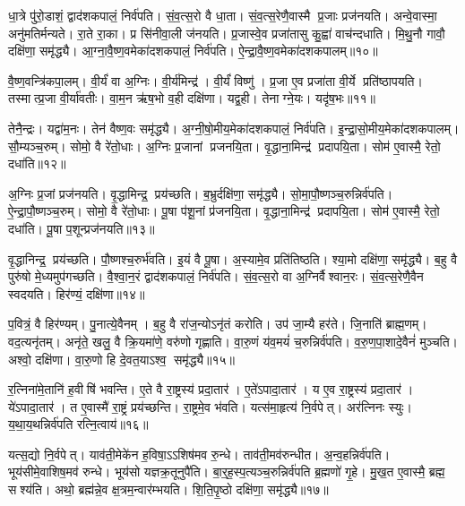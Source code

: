 धा॒त्रे पु॑रो॒डाशं॒ द्वाद॑शकपालं॒ निर्व॑पति।
सं॒व॒त्स॒रो वै धा॒ता।
सं॒व॒त्स॒रेणै॒वास्मै प्र॒जाः प्रज॑नयति।
अन्वे॒वास्मा॒ अनु॑मतिर्मन्यते।
रा॒ते रा॒का।
प्र सि॑नीवा॒ली ज॑नयति।
प्र॒जास्वे॒व प्रजा॑तासु कु॒ह्वा॑ वाच॑न्दधाति।
मि॒थु॒नौ गावौ॒ दक्षि॑णा॒ समृ॑द्ध्यै।
आ॒ग्ना॒वै॒ष्ण॒वमेका॑दशकपालं॒ निर्व॑पति।
ऐ॒न्द्रा॒वै॒ष्ण॒वमेका॑दशकपालम्॥१०॥

वै॒ष्ण॒वन्त्रि॑कपा॒लम्।
वी॒र्यं॑ वा अ॒ग्निः।
वी॒र्य॑मिन्द्र॑।
वी॒र्यं॑ विष्णु॑।
प्र॒जा ए॒व प्रजा॑ता वी॒र्ये प्रति॑ष्ठापयति।
तस्मात्प्र॒जा वी॒र्या॑वतीः।
वा॒म॒न ऋ॑ष॒भो व॒ही दक्षि॑णा।
यद्व॒ही।
तेनाग्ने॒यः।
यदृ॑ष॒भः॥११॥

तेनै॒न्द्रः।
यद्वा॑म॒नः।
तेन॑ वैष्ण॒वः समृ॑द्ध्यै।
अ॒ग्नी॒षो॒मीय॒मेका॑दशकपालं॒ निर्व॑पति।
इ॒न्द्रा॒सो॒मीय॒मेका॑दशकपालम्।
सौ॒म्यञ्च॒रुम्।
सोमो॒ वै रे॑तो॒धाः।
अ॒ग्निः प्र॒जानां प्रजनयि॒ता।
वृ॒द्धाना॒मिन्द्र॑ प्रदापयि॒ता।
सोम॑ ए॒वास्मै॒ रेतो॒ दधा॑ति॥१२॥

अ॒ग्निः प्र॒जां प्रज॑नयति।
वृ॒द्धामिन्द्र॒ प्रय॑च्छति।
ब॒भ्रुर्दक्षि॑णा॒ समृ॑द्ध्यै।
सो॒मा॒पौ॒ष्णञ्च॒रुन्निर्व॑पति।
ऐ॒न्द्रा॒पौ॒ष्णञ्च॒रुम्।
सोमो॒ वै रे॑तो॒धाः।
पू॒षा प॑शू॒नां प्र॑जनयि॒ता।
वृ॒द्धाना॒मिन्द्र॑ प्रदापयि॒ता।
सोम॑ ए॒वास्मै॒ रेतो॒ दधा॑ति।
पू॒षा प॒शून्प्रज॑नयति॥१३॥

वृ॒द्धानिन्द्र॒ प्रय॑च्छति।
पौ॒ष्णश्च॒रुर्भ॑वति।
इ॒यं वै पू॒षा।
अ॒स्यामे॒व प्रति॑तिष्ठति।
श्या॒मो दक्षि॑णा॒ समृ॑द्ध्यै।
ब॒हु वै पुरु॑षो मे॒ध्यमुप॑गच्छति।
वै॒श्वा॒न॒रं द्वाद॑शकपालं॒ निर्व॑पति।
सं॒व॒त्स॒रो वा अ॒ग्निर्वैश्वान॒रः।
सं॒व॒त्स॒रेणै॒वैन स्वदयति।
हिर॑ण्यं॒ दक्षि॑णा॥१४॥

प॒वित्रं॒ वै हिर॑ण्यम्।
पु॒नात्ये॒वैनम्।
ब॒हु वै रा॑ज॒न्योऽनृ॑तं करोति।
उप॑ जा॒म्यै हर॑ते।
जि॒नाति॑ ब्राह्म॒णम्।
वद॒त्यनृ॑तम्।
अनृ॑ते॒ खलु॒ वै क्रि॒यमा॑णे॒ वरु॑णो गृह्णाति।
वा॒रु॒णं य॑व॒मयं॑ च॒रुन्निर्व॑पति।
व॒रु॒ण॒पा॒शादे॒वैनं॑ मुञ्चति।
अश्वो॒ दक्षि॑णा।
वा॒रु॒णो हि दे॒वत॒याऽश्व॒ समृ॑द्ध्यै॥१५॥

र॒त्निना॑मे॒तानि॑ ह॒वीषि॑ भवन्ति।
ए॒ते वै रा॒ष्ट्रस्य॑ प्रदा॒तार॑।
ए॒ते॑ऽपादा॒तार॑।
य ए॒व रा॒ष्ट्रस्य॑ प्रदा॒तार॑।
ये॑ऽपादा॒तार॑।
त ए॒वास्मै॑ रा॒ष्ट्रं प्रय॑च्छन्ति।
रा॒ष्ट्रमे॒व भ॑वति।
यत्स॑मा॒हृत्य॑ नि॒र्वपेत्।
अर॑त्निनः स्युः।
य॒था॒य॒थन्निर्व॑पति रत्नि॒त्वाय॑॥१६॥

यत्स॒द्यो नि॒र्वपेत्।
याव॑ती॒मेके॑न ह॒विषा॒ऽऽशिष॑मव रु॒न्धे।
ताव॑ती॒मव॑रुन्धीत।
अ॒न्व॒हन्निर्व॑पति।
भूय॑सीमे॒वाशिष॒मव॑ रुन्धे।
भूय॑सो यज्ञक्र॒तूनुपै॑ति।
बा॒र्॒ह॒स्प॒त्यञ्च॒रुन्निर्व॑पति ब्र॒ह्मणो॑ गृ॒हे।
मु॒ख॒त ए॒वास्मै॒ ब्रह्म॒ सश्य॑ति।
अथो॒ ब्रह्म॑न्ने॒व क्ष॒त्रम॒न्वार॑म्भयति।
शि॒ति॒पृ॒ष्ठो दक्षि॑णा॒ समृ॑द्ध्यै॥१७॥


